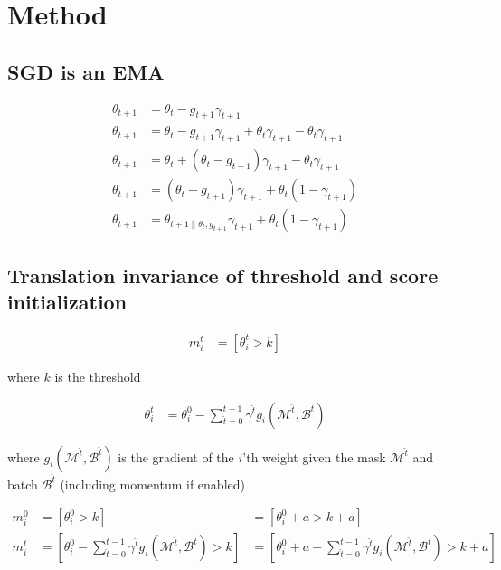 \documentclass[12pt]{report}
\begin{document}
    \chapter{Method}

    \section{SGD is an EMA}

    \begin{align}
        \label{eq:ema}
        \theta_{t+1} &= \theta_{t} - g_{t+1}\gamma_{t+1}\\
        \theta_{t+1} &= \theta_{t} - g_{t+1}\gamma_{t+1} + \theta_t\gamma_{t+1} - \theta_t\gamma_{t+1}\\
        \theta_{t+1} &= \theta_{t} + (\theta_t - g_{t+1})\gamma_{t+1} - \theta_t\gamma_{t+1}\\
        \theta_{t+1} &= (\theta_t - g_{t+1})\gamma_{t+1} + \theta_t(1 - \gamma_{t+1})\\
        \theta_{t+1} &= \theta_{t+1\|\theta_t,g_{t+1}} \gamma_{t+1} + \theta_{t}(1-\gamma_{t+1})
    \end{align}


    \section{Translation invariance of threshold and score initialization}

    \begin{align}
        m_i^t &= [\theta_i^t > k]
    \end{align}

    where $k$ is the threshold

    \begin{align}
        \theta_i^{t} &= \theta_i^0 - \sum_{\hat t=0}^{t-1} \gamma^{\hat t} g_{i}(\mathcal{M}^{\hat t}, \mathcal{B}^{\hat t})
    \end{align}

    where $g_{i}(\mathcal{M}^{\hat t}, \mathcal{B}^{\hat t})$ is the gradient of the $i$'th weight given the mask $\mathcal{M}^{\hat t}$ and batch $\mathcal{B}^{\hat t}$ (including momentum if enabled)

    \begin{align}
        m_i^0 &= [\theta_i^0 > k] &= [\theta_i^0 + a > k + a] \\
        m_i^{t} &= [\theta_i^0 - \sum_{\hat t=0}^{t-1} \gamma^{\hat t} g_{i}(\mathcal{M}^{\hat t}, \mathcal{B}^{\hat t}) > k] &= [\theta_i^0 + a - \sum_{\hat t=0}^{t-1} \gamma^{\hat t} g_{i}(\mathcal{M}^{\hat t}, \mathcal{B}^{\hat t}) > k + a]\label{eq:recur}
    \end{align}
\end{document}
